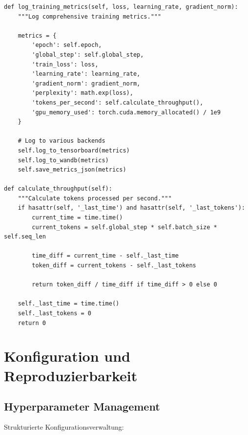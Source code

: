 \begin{lstlisting}[style=pythonstyle, caption=Monitoring Implementation]
def log_training_metrics(self, loss, learning_rate, gradient_norm):
    """Log comprehensive training metrics."""
    
    metrics = {
        'epoch': self.epoch,
        'global_step': self.global_step,
        'train_loss': loss,
        'learning_rate': learning_rate,
        'gradient_norm': gradient_norm,
        'perplexity': math.exp(loss),
        'tokens_per_second': self.calculate_throughput(),
        'gpu_memory_used': torch.cuda.memory_allocated() / 1e9
    }
    
    # Log to various backends
    self.log_to_tensorboard(metrics)
    self.log_to_wandb(metrics)
    self.save_metrics_json(metrics)

def calculate_throughput(self):
    """Calculate tokens processed per second."""
    if hasattr(self, '_last_time') and hasattr(self, '_last_tokens'):
        current_time = time.time()
        current_tokens = self.global_step * self.batch_size * self.seq_len
        
        time_diff = current_time - self._last_time
        token_diff = current_tokens - self._last_tokens
        
        return token_diff / time_diff if time_diff > 0 else 0
    
    self._last_time = time.time()
    self._last_tokens = 0
    return 0
\end{lstlisting}

\section{Konfiguration und Reproduzierbarkeit}

\subsection{Hyperparameter Management}

Strukturierte Konfigurationsverwaltung:

